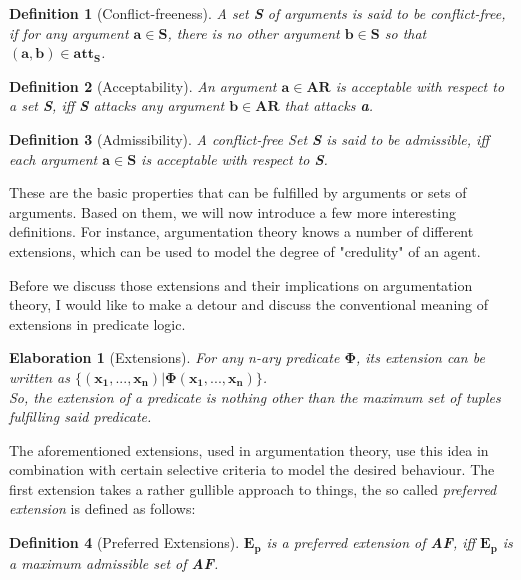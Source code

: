 \documentclass[12pt]{report}
\theoremstyle{break}
\newtheorem{defn}{Definition}[chapter]
\newtheorem{elab}{Elaboration}[chapter]
\begin{document}
\begin{defn}[Conflict-freeness]
A set \textbf{S} of arguments is said to be conflict-free, if for any argument $\bm{a \in S}$, there is no other argument $\bm{b \in S}$ so that $\bm{(a,b) \in att_{S}}$.
\end{defn}

\begin{defn}[Acceptability]
An argument $\bm{a \in AR}$ is acceptable with respect to a set \textbf{S}, iff \textbf{S} attacks any argument $\bm{b \in AR}$ that attacks \textbf{a}. 
\end{defn}

\begin{defn}[Admissibility]
A conflict-free Set \textbf{S} is said to be admissible, iff each argument $\bm{a \in S}$ is acceptable with respect to \textbf{S}.
\end{defn}

These are the basic properties that can be fulfilled by arguments or sets of arguments. Based on them, we will now introduce a few more interesting definitions.
For instance, argumentation theory knows a number of different extensions, which can be used to model the degree of "credulity" of an agent.

Before we discuss those extensions and their implications on argumentation theory, I would like to make a detour and discuss the conventional meaning of extensions in predicate logic.

\begin{elab}[Extensions]
For any n-ary predicate $\bm{\Phi}$, its extension can be written as $\bm{\{(x_{1},...,x_{n})|\Phi(x_{1},...,x_{n})\}}$.\\
So, the extension of a predicate is nothing other than the maximum set of tuples \\ fulfilling said predicate.
\end{elab}

\newpage

The aforementioned extensions, used in argumentation theory, use this idea in combination with certain selective criteria to model the desired behaviour. 
The first extension takes a rather gullible approach to things, the so called \textit{preferred extension} is defined as follows:

\begin{defn}[Preferred Extensions]
$\bm{E_{p}}$ is a preferred extension of \textbf{AF}, iff $\bm{E_{p}}$ is a maximum admissible set of \textbf{AF}.
\end{defn}
\end{document}
